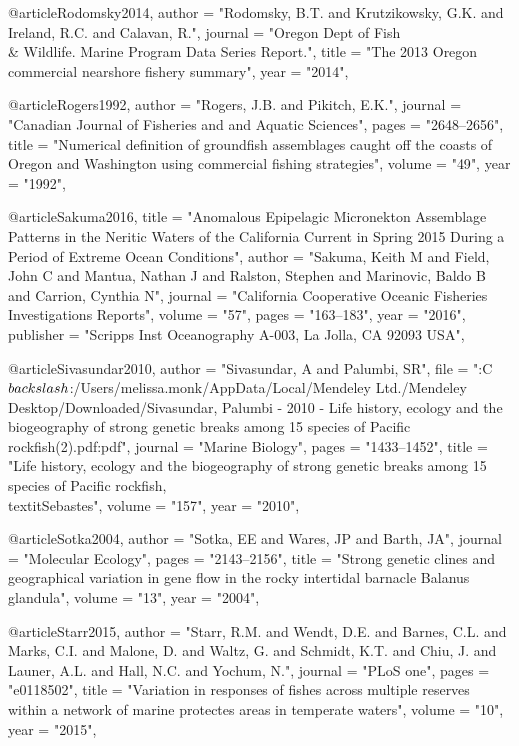 @article{Rodomsky2014,
    author = "{Rodomsky, B.T. and Krutzikowsky, G.K. and Ireland, R.C. and Calavan, R.}",
    journal = "{Oregon Dept of Fish \\& Wildlife. Marine Program Data Series Report.}",
    title = "{{The 2013 Oregon commercial nearshore fishery summary}}",
    year = "{2014}",
}

@article{Rogers1992,
    author = "{Rogers, J.B. and Pikitch, E.K.}",
    journal = "{Canadian Journal of Fisheries and and Aquatic Sciences}",
    pages = "{2648--2656}",
    title = "{{Numerical definition of groundfish assemblages caught off the coasts of Oregon and Washington using commercial fishing strategies}}",
    volume = "{49}",
    year = "{1992}",
}

@article{Sakuma2016,
    title = "{Anomalous Epipelagic Micronekton Assemblage Patterns in the Neritic Waters of the California Current in Spring 2015 During a Period of Extreme Ocean Conditions}",
    author = "{Sakuma, Keith M and Field, John C and Mantua, Nathan J and Ralston, Stephen and Marinovic, Baldo B and Carrion, Cynthia N}",
    journal = "{California Cooperative Oceanic Fisheries Investigations Reports}",
    volume = "{57}",
    pages = "{163--183}",
    year = "{2016}",
    publisher = "{Scripps Inst Oceanography A-003, La Jolla, CA 92093 USA}",
}

@article{Sivasundar2010,
    author = "{Sivasundar, A and Palumbi, SR}",
    file = "{:C$\\backslash$:/Users/melissa.monk/AppData/Local/Mendeley Ltd./Mendeley Desktop/Downloaded/Sivasundar, Palumbi - 2010 - Life history, ecology and the biogeography of strong genetic breaks among 15 species of Pacific rockfish(2).pdf:pdf}",
    journal = "{Marine Biology}",
    pages = "{1433--1452}",
    title = "{{Life history, ecology and the biogeography of strong genetic breaks among 15 species of Pacific rockfish, \\textit{{Sebastes}}}}",
    volume = "{157}",
    year = "{2010}",
}

@article{Sotka2004,
    author = "{Sotka, EE and Wares, JP and Barth, JA}",
    journal = "{Molecular Ecology}",
    pages = "{2143--2156}",
    title = "{{Strong genetic clines and geographical variation in gene flow in the rocky intertidal barnacle Balanus glandula}}",
    volume = "{13}",
    year = "{2004}",
}

@article{Starr2015,
    author = "{Starr, R.M. and Wendt, D.E. and Barnes, C.L. and Marks, C.I. and Malone, D. and Waltz, G. and Schmidt, K.T. and Chiu, J. and Launer, A.L. and Hall, N.C. and Yochum, N.}",
    journal = "{PLoS one}",
    pages = "{e0118502}",
    title = "{{Variation in responses of fishes across multiple reserves within a network of marine protectes areas in temperate waters}}",
    volume = "{10}",
    year = "{2015}",
}

